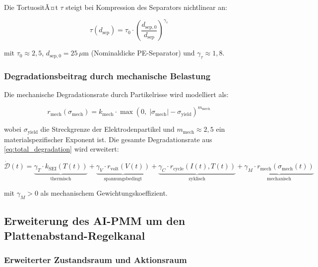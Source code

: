 ﻿\documentclass[12pt,a4paper]{article}
\begin{document}
Die TortuositÃ¤t $\tau$ steigt bei Kompression des Separators nichtlinear an:

\begin{equation}
	\tau(d_\mathrm{sep}) = \tau_0 \cdot \left(\frac{d_\mathrm{sep,0}}{d_\mathrm{sep}}\right)^{\!\gamma_\tau}
	\label{eq:tortuosity}
\end{equation}

mit $\tau_0 \approx 2{,}5$, $d_\mathrm{sep,0} = 25\,\mu\mathrm{m}$
(Nominaldicke PE-Separator) und $\gamma_\tau \approx 1{,}8$.

\subsubsection{Degradationsbeitrag durch mechanische Belastung}

Die mechanische Degradationsrate durch Partikelrisse wird modelliert als:

\begin{equation}
	r_\mathrm{mech}(\sigma_\mathrm{mech}) = k_\mathrm{mech}
	\cdot \max\!\left(0,\; |\sigma_\mathrm{mech}| - \sigma_\mathrm{yield}\right)^{\!m_\mathrm{mech}}
	\label{eq:mech_deg_rate}
\end{equation}

wobei $\sigma_\mathrm{yield}$ die Streckgrenze der Elektrodenpartikel und
$m_\mathrm{mech} \approx 2{,}5$ ein materialspezifischer Exponent ist.
Die gesamte Degradationsrate aus \eqref{eq:total_degradation} wird erweitert:

\begin{equation}
	\dot{\mathcal{D}}(t) = \underbrace{\gamma_T \cdot k_\mathrm{SEI}(T(t))}_{\text{thermisch}}
	+ \underbrace{\gamma_V \cdot r_\mathrm{volt}(V(t))}_{\text{spannungsbedingt}}
	+ \underbrace{\gamma_C \cdot r_\mathrm{cycle}(I(t), T(t))}_{\text{zyklisch}}
	+ \underbrace{\gamma_M \cdot r_\mathrm{mech}(\sigma_\mathrm{mech}(t))}_{\text{mechanisch}}
	\label{eq:total_degradation_extended}
\end{equation}

mit $\gamma_M > 0$ als mechanischem Gewichtungskoeffizient.

\subsection{Erweiterung des AI-PMM um den Plattenabstand-Regelkanal}

\subsubsection{Erweiterter Zustandsraum und Aktionsraum}
\end{document}
